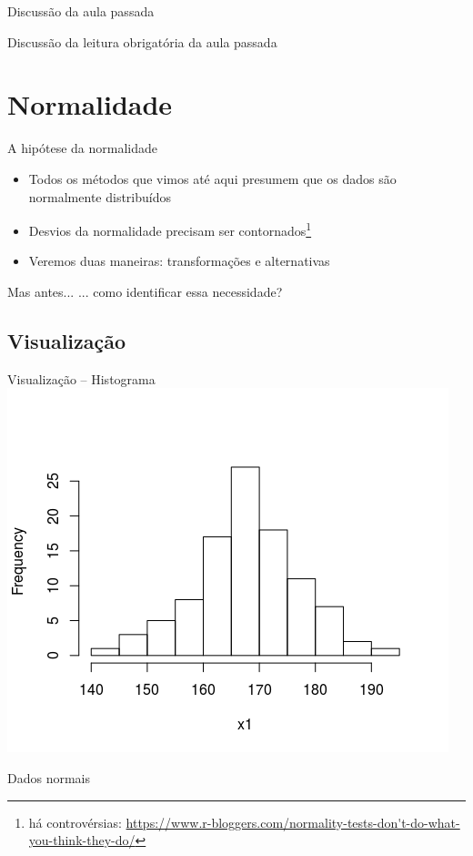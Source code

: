 \documentclass{beamer}
\begin{document}

\begin{frame}{\scriptsize Discussão da aula passada}
  \begin{block}{}
    Discussão da leitura obrigatória da aula passada
  \end{block}
\end{frame}

\section{Normalidade}

\begin{frame}{\scriptsize A hipótese da normalidade}
  \begin{itemize}
    \footnotesize
  \item Todos os métodos que vimos até aqui presumem que os dados são normalmente distribuídos
  \item Desvios da normalidade precisam ser contornados\footnote{\tiny há controvérsias: {\tiny  \url{https://www.r-bloggers.com/normality-tests-don't-do-what-you-think-they-do/}}}
    \bigskip
  \item Veremos duas maneiras: transformações e alternativas
  \end{itemize}
    \bigskip
  \begin{block}{Mas antes...}
    \footnotesize
    ... como identificar essa necessidade?
  \end{block}
\end{frame}

\subsection{Visualização}

\begin{frame}{\scriptsize Visualização -- Histograma}
  \centering
  \includegraphics[width=.7\textwidth]{Cap37-38/normal1-h}

  Dados normais
\end{frame}
\end{document}
